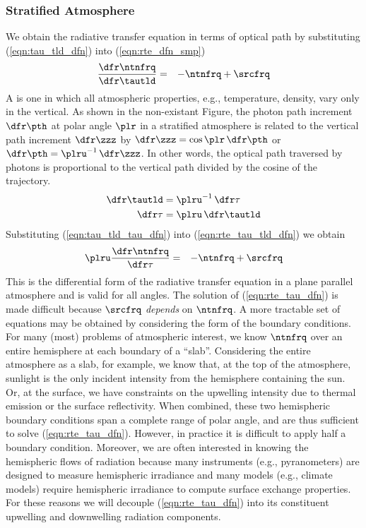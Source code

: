 \documentclass[12pt]{article}
\begin{document}
\subsubsection[Stratified Atmosphere]{Stratified Atmosphere}\label{sxn:str_atm}
We obtain the radiative transfer equation in terms of optical path
by substituting (\ref{eqn:tau_tld_dfn}) into (\ref{eqn:rte_dfn_smp})
\begin{eqnarray}
\frac{\dfr\ntnfrq}{\dfr\tautld} & = & -\ntnfrq + \srcfrq
\label{eqn:rte_tau_tld_dfn}
\end{eqnarray}
A  is one in which all atmospheric
properties, e.g., temperature, density, vary only in the vertical. 
As shown in the non-existant Figure, the photon path increment
$\dfr\pth$ at polar angle $\plr$ in a stratified atmosphere is related
to the vertical path increment $\dfr\zzz$ by $\dfr\zzz = \cos \plr \,
\dfr\pth$ or $\dfr\pth = \plru^{-1} \,\dfr\zzz$. 
In other words, the optical path traversed by photons is proportional
to the vertical path divided by the cosine of the trajectory.
\begin{subequations}
\label{eqn:dfr_tau_tld_tau_dfn}
\begin{align}
\label{eqn:tau_tld_tau_dfn}
\dfr\tautld & = \plru^{-1} \,\dfr\tau \\
\label{eqn:tau_tau_tld_dfn}
\dfr\tau & = \plru \,\dfr\tautld
\end{align}
\end{subequations}
Substituting 
(\ref{eqn:tau_tld_tau_dfn}) into (\ref{eqn:rte_tau_tld_dfn})  
we obtain
\begin{eqnarray}
\plru \frac{\dfr\ntnfrq}{\dfr\tau} & = & -\ntnfrq + \srcfrq
\label{eqn:rte_tau_dfn}
\end{eqnarray}
This is the differential form of the radiative transfer equation in a
plane parallel atmosphere and is valid for all angles.
The solution of (\ref{eqn:rte_tau_dfn}) is made difficult because
$\srcfrq$ \textit{depends} on $\ntnfrq$.
A more tractable set of equations may be obtained by considering
the form of the boundary conditions.
For many (most) problems of atmospheric interest, we know $\ntnfrq$
over an entire hemisphere at each boundary of a ``slab''.
Considering the entire atmosphere as a slab, for example, we know
that, at the top of the atmosphere, sunlight is the only incident
intensity from the hemisphere containing the sun. 
Or, at the surface, we have constraints on the upwelling intensity 
due to thermal emission or the 
surface reflectivity.
When combined, these two hemispheric boundary conditions span a
complete range of polar angle, and are thus sufficient to solve 
(\ref{eqn:rte_tau_dfn}).
However, in practice it is difficult to apply half a boundary
condition. 
Moreover, we are often interested in knowing the hemispheric flows of 
radiation because many instruments (e.g., pyranometers) are designed
to measure hemispheric irradiance and many models (e.g., climate
models) require hemispheric irradiance to compute surface exchange
properties.
For these reasons we will decouple (\ref{eqn:rte_tau_dfn}) into
its constituent upwelling and downwelling radiation components.
\end{document}
